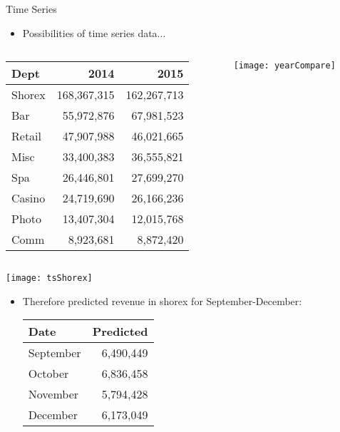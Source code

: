 \documentclass{beamer}
\begin{document}
\begin{frame}{Time Series}
	\begin{itemize}
		\item Possibilities of time series data...
	\end{itemize}
	\begin{columns}
		\begin{column}{.5\textwidth}
	\begin{tabular}{lrr}
		Dept & 2014 & 2015 \\
		\hline 
		Shorex & 168,367,315 & 162,267,713 \\
		Bar & 55,972,876 & 67,981,523 \\
		Retail & 47,907,988 & 46,021,665 \\
		Misc & 33,400,383 & 36,555,821 \\
		Spa & 26,446,801 & 27,699,270 \\
		Casino & 24,719,690 & 26,166,236 \\
		Photo & 13,407,304 & 12,015,768 \\
		Comm & 8,923,681 & 8,872,420 \\
	\end{tabular} 
			\end{column}
			\begin{column}{.5\textwidth}
	\centering
	\texttt{[image: yearCompare]}
					\end{column}
		\end{columns}					
\end{frame}

\begin{frame}
			\centering
	\texttt{[image: tsShorex]}
	\begin{itemize}
		\item Therefore predicted revenue in shorex for September-December:
\centering
		\begin{tabular}{lr}
			Date & Predicted \\
			\hline 
			September & 6,490,449 \\
			October & 6,836,458 \\
			November & 5,794,428 \\
			December & 6,173,049 \\
		\end{tabular}
		
	\end{itemize}
\end{frame}

	
	
	
	
	
	
	
\end{document}
